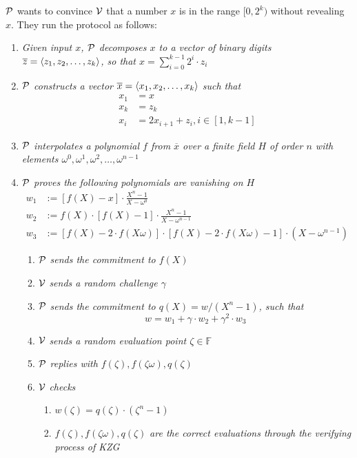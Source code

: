 $\mathcal{P}$ wants to convince $\mathcal{V}$ that a number $x$ is in the range $[0,2^k)$ without revealing $x$. They run the protocol as follows:
\begin{enumerate}
    \item \textit{Given input $x$, $\mathcal{P}$ decomposes $x$ to a vector of binary digits $\overline{z}=\left \langle z_1,z_2,\dots,z_k \right \rangle$, so that $x=\sum_{i=0}^{k-1}2^i\cdot{z_i}$} 
    \item \textit{$\mathcal{P}$ constructs a vector $\overline{x}=\left \langle x_1,x_2,\dots,x_k \right \rangle$ such that}
    \begin{align*}
        x_1&=x \\
        x_k&=z_k \\
        x_i&=2x_{i+1}+z_i,i\in[1,k-1]
    \end{align*}
    \item \textit{$\mathcal{P}$ interpolates a polynomial $f$ from $\overline{x}$ over a finite field $H$ of order $n$ with elements $\omega^0,\omega^1,\omega^2,\ldots,\omega^{n-1}$} 
    \item \textit{$\mathcal{P}$ proves the following polynomials are vanishing on $H$}
    \begin{align*}
        w_1&:=[f(X)-x]\cdot\frac{X^n-1}{X-\omega^0} \\
        w_2&:=f(X)\cdot[f(X)-1]\cdot\frac{X^n-1}{X-\omega^{n-1}} \\
        w_3&:=[f(X)-2\cdot{f(X\omega)}]\cdot[f(X)-2\cdot{f(X\omega)}-1]\cdot(X-\omega^{n-1})
    \end{align*}
    \begin{enumerate}
        \item $\mathcal{P}$ \textit{sends the commitment to $f(X)$}
        \item $\mathcal{V}$ \textit{sends a random challenge $\gamma$}
        \item $\mathcal{P}$ \textit{sends the commitment to $q(X)=w/(X^n-1)$, such that}
        \[ w=w_1+\gamma\cdot{w_2}+\gamma^2\cdot{w_3} \]
        \item $\mathcal{V}$ \textit{sends a random evaluation point $\zeta\in\mathbb{F}$}
        \item $\mathcal{P}$ \textit{replies with $f(\zeta),f(\zeta\omega),q(\zeta)$}
        \item $\mathcal{V}$ \textit{checks}
        \begin{enumerate}
            \item $w(\zeta)=q(\zeta)\cdot(\zeta^n-1)$
            \item $f(\zeta),f(\zeta\omega),q(\zeta)$ \textit{are the correct evaluations through the verifying process of KZG}
        \end{enumerate}
    \end{enumerate}
\end{enumerate}

